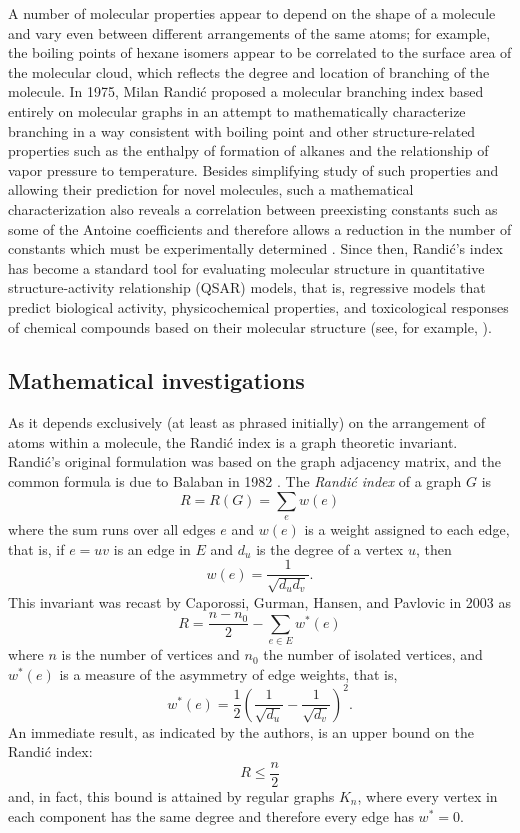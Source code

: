 \documentclass{amsart}
\theoremstyle{definition}
\begin{document}
A number of molecular properties appear to depend on the shape of a molecule and vary even between different arrangements of the same atoms; for example, the boiling points of hexane isomers appear to be correlated to the surface area of the molecular cloud, which reflects the degree and location of branching of the molecule. In 1975, Milan Randi\'c proposed a molecular branching index based entirely on molecular graphs in an attempt to mathematically characterize branching in a way consistent with boiling point and other structure-related properties such as the enthalpy of formation of alkanes and the relationship of vapor pressure to temperature. Besides simplifying study of such properties and allowing their prediction for novel molecules, such a mathematical characterization also reveals a correlation between preexisting constants such as some of the Antoine coefficients and therefore allows a reduction in the number of constants which must be experimentally determined \cite{randic1975characterization}. Since then, Randi\'c's index has become a standard tool for evaluating molecular structure in quantitative structure-activity relationship (QSAR) models, that is, regressive models that predict biological activity, physicochemical properties, and toxicological responses of chemical compounds based on their molecular structure (see, for example, \cite{kier1986molecular, pogliani2000molecular, garcia2008some, todeschini2008handbook, kier2012molecular}). 


\subsection*{Mathematical investigations}
As it depends exclusively (at least as phrased initially) on the arrangement of atoms within a molecule, the Randi\'c index is a graph theoretic invariant. Randi\'c's original formulation was based on the graph adjacency matrix, and the common formula is due to Balaban in 1982 \cite{balaban1982discriminating}. The \emph{Randi\'c index} of a graph $G$ is
\[R=R(G) = \sum_{e} w(e)\]
where the sum runs over all edges $e$ and $w(e)$ is a weight assigned to each edge, that is, if $e=uv$ is an edge in $E$ and $d_u$ is the degree of a vertex $u$, then
\[w(e) = \frac{1}{\sqrt {d_u d_v}}.\]
This invariant was recast by Caporossi, Gurman, Hansen, and Pavlovic in 2003 \cite{caporossi2003graphs} as 
\[R = \frac{n-n_0}{2} - \sum_{e\in E} w^\ast(e)\]
where $n$ is the number of vertices and $n_0$ the number of isolated vertices, and $w^\ast(e)$ is a measure of the asymmetry of edge weights, that is, 
\begin{equation}\label{eqn:weight}w^\ast(e) = \frac{1}{2}\left(\frac{1}{\sqrt{d_u}}-\frac{1}{\sqrt{d_v}}\right)^2.\end{equation}
An immediate result, as indicated by the authors, is an upper bound on the Randi\'c index:
\[R \leq \frac{n}{2}\]
and, in fact, this bound is attained by regular graphs $K_n$, where every vertex in each component has the same degree and therefore every edge has $w^\ast = 0$.
\end{document}
